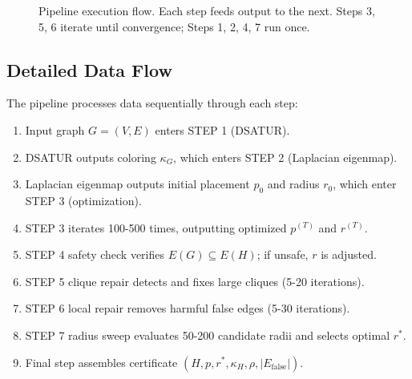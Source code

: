 \documentclass[11pt]{article}
\newcommand{\Efalse}{E_{\mathrm{false}}}
\begin{document}
\begin{figure}[h]
\caption{Pipeline execution flow. Each step feeds output to the next. Steps 3, 5, 6
iterate until convergence; Steps 1, 2, 4, 7 run once.}
\label{fig:pipeline}
\end{figure}

\subsection{Detailed Data Flow}

The pipeline processes data sequentially through each step:

\begin{enumerate}
  \item Input graph $G = (V, E)$ enters STEP 1 (DSATUR).
  \item DSATUR outputs coloring $\kappa_G$, which enters STEP 2 (Laplacian eigenmap).
  \item Laplacian eigenmap outputs initial placement $p_0$ and radius $r_0$, which enter STEP 3 (optimization).
  \item STEP 3 iterates 100-500 times, outputting optimized $p^{(T)}$ and $r^{(T)}$.
  \item STEP 4 safety check verifies $E(G) \subseteq E(H)$; if unsafe, $r$ is adjusted.
  \item STEP 5 clique repair detects and fixes large cliques (5-20 iterations).
  \item STEP 6 local repair removes harmful false edges (5-30 iterations).
  \item STEP 7 radius sweep evaluates 50-200 candidate radii and selects optimal $r^*$.
  \item Final step assembles certificate $(H, p, r^*, \kappa_H, \rho, |\Efalse|)$.
\end{enumerate}
\end{document}
